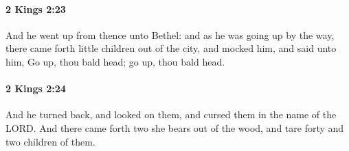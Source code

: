 		\paragraph{2 Kings 2:23} %
			\label{2KINGS-2-23}

			And he went up from thence unto Bethel: and as he was going up by the way, there came forth little children out of the city, and mocked him, and said unto him, Go up, thou bald head; go up, thou bald head.


		\paragraph{2 Kings 2:24} %
			\label{2KINGS-2-24}

			And he turned back, and looked on them, and cursed them in the name of the LORD. And there came forth two she bears out of the wood, and tare forty and two children of them.

